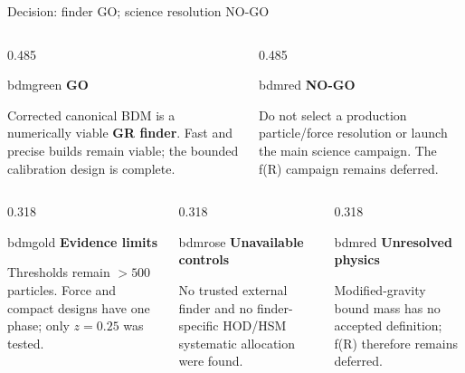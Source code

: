 \documentclass[UTF8]{beamer}
\begin{document}
\begin{frame}{Decision: finder GO; science resolution NO-GO}
  \footnotesize
  \begin{columns}[T,totalwidth=\textwidth]
    \begin{column}{0.485\textwidth}
      \begin{phasebox}[colback=bdmgreen!7,top=1.0mm,bottom=1.0mm]{bdmgreen}
        {\color{bdmgreen}\bfseries\large GO}\par\smallskip
        Corrected canonical BDM is a numerically viable \textbf{GR finder}.
        Fast and precise builds remain viable; the bounded calibration design
        is complete.
      \end{phasebox}
    \end{column}
    \hfill
    \begin{column}{0.485\textwidth}
      \begin{phasebox}[colback=bdmred!7,top=1.0mm,bottom=1.0mm]{bdmred}
        {\color{bdmred}\bfseries\large NO-GO}\par\smallskip
        Do not select a production particle/force resolution or launch the main
        science campaign. The f(R) campaign remains deferred.
      \end{phasebox}
    \end{column}
  \end{columns}

  \vspace{0.5ex}

  \begin{columns}[T,totalwidth=\textwidth]
    \begin{column}{0.318\textwidth}
      \begin{phasebox}[top=0.9mm,bottom=0.9mm]{bdmgold}
        {\color{bdmgold}\bfseries Evidence limits}\par\smallskip
        Thresholds remain $>500$ particles. Force and compact designs have one
        phase; only $z=0.25$ was tested.
      \end{phasebox}
    \end{column}
    \hfill
    \begin{column}{0.318\textwidth}
      \begin{phasebox}[top=0.9mm,bottom=0.9mm]{bdmrose}
        {\color{bdmrose}\bfseries Unavailable controls}\par\smallskip
        No trusted external finder and no finder-specific HOD/HSM systematic
        allocation were found.
      \end{phasebox}
    \end{column}
    \hfill
    \begin{column}{0.318\textwidth}
      \begin{phasebox}[top=0.9mm,bottom=0.9mm]{bdmred}
        {\color{bdmred}\bfseries Unresolved physics}\par\smallskip
        Modified-gravity bound mass has no accepted definition; f(R) therefore
        remains deferred.
      \end{phasebox}
    \end{column}
  \end{columns}


\end{frame}
\end{document}
